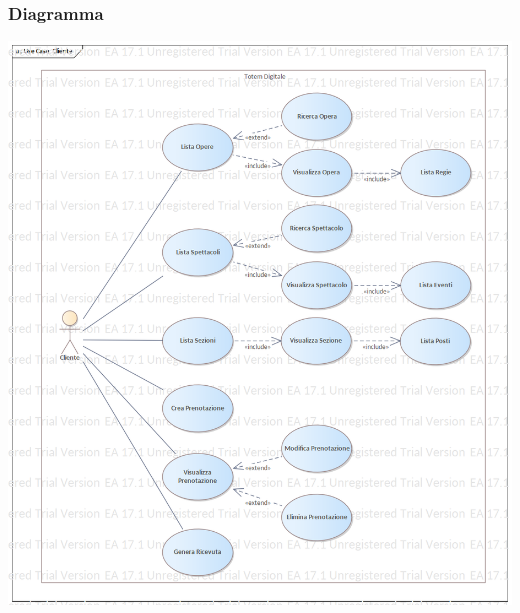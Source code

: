 \documentclass{article}
\begin{document}
            \subsubsection{Diagramma}
                \includegraphics[width=\textwidth]{imgs/use_case/cliente}
\end{document}
